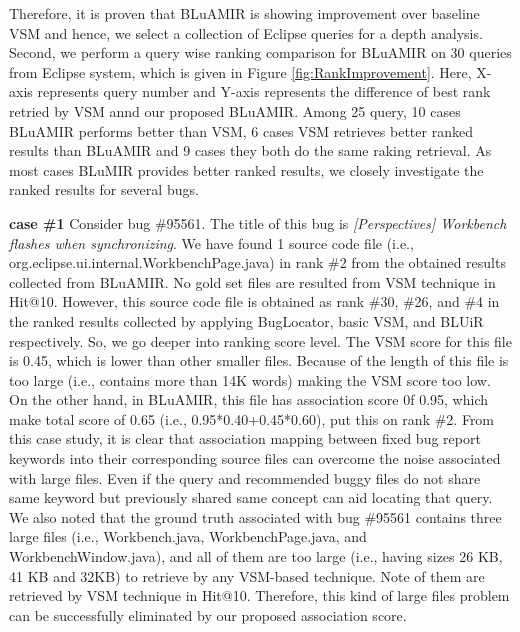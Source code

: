 \documentclass[conference]{IEEEtran}
\begin{document}
Therefore, it is proven that BLuAMIR is showing improvement over baseline VSM and hence, we select a collection of Eclipse queries for a depth analysis.
Second, we perform a query wise ranking comparison for BLuAMIR on 30 queries from Eclipse system, which is given in Figure \ref{fig:RankImprovement}. Here, X-axis represents query number and Y-axis represents the difference of best rank retried by VSM annd our proposed BLuAMIR. Among 25 query, 10 cases BLuAMIR performs better than VSM, 6 cases VSM retrieves better ranked results than BLuAMIR and 9 cases they both do the same raking retrieval. As most cases BLuMIR provides better ranked results, we closely investigate the ranked results for several bugs. 

\textbf{case \#1} Consider bug \#95561. The title of this bug is \textit{[Perspectives] Workbench flashes when synchronizing}. We have found 1 source code file (i.e., org.eclipse.ui.internal.WorkbenchPage.java) in rank \#2 from the obtained results collected from BLuAMIR. No gold set files are resulted from VSM technique in Hit@10. 
However, this source code file is obtained as rank \#30, \#26, and \#4 in the ranked results collected by applying BugLocator\cite{Jian}, basic VSM, and BLUiR\cite{Saha} respectively. 
So, we go deeper into ranking score level. The VSM score for this file is 0.45, which is lower than other smaller files. 
Because of the length of this file is too large (i.e., contains more than 14K words) making the VSM score too low. On the other hand, in BLuAMIR, this file has association score 0f 0.95, which make total score of 0.65 (i.e., 0.95*0.40+0.45*0.60), put this on rank \#2. From this case study, it is clear that association mapping between fixed bug report keywords into their corresponding source files can overcome the noise associated with large files. Even if the query and recommended buggy files do not share same keyword but previously shared same concept can aid locating that query. 
We also noted that the ground truth associated with bug \#95561 contains three large files (i.e., Workbench.java, WorkbenchPage.java, and WorkbenchWindow.java), and all of them are too large (i.e., having sizes 26 KB, 41 KB and 32KB) to retrieve by any VSM-based technique. Note of them are retrieved by VSM technique in Hit@10. Therefore, this kind of large files problem can be successfully eliminated by our proposed association score.
\end{document}

